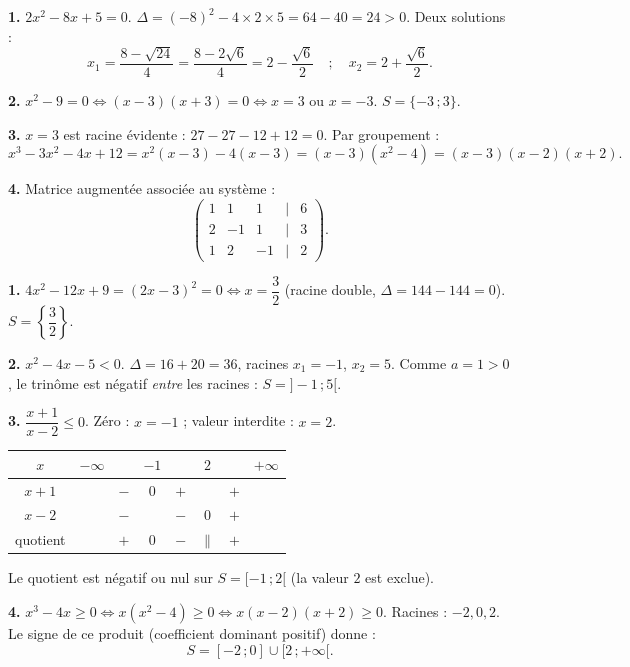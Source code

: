 \documentclass[11pt]{article}
\begin{document}
\begin{corrige}
\textbf{1.} $2x^2 - 8x + 5 = 0$. $\Delta = (-8)^2 - 4 \times 2 \times 5 = 64 - 40 = 24 > 0$. Deux solutions :
\[ x_1 = \frac{8 - \sqrt{24}}{4} = \frac{8 - 2\sqrt{6}}{4} = 2 - \frac{\sqrt{6}}{2} \quad ; \quad x_2 = 2 + \frac{\sqrt{6}}{2}. \]

\textbf{2.} $x^2 - 9 = 0 \iff (x-3)(x+3) = 0 \iff x = 3$ ou $x = -3$. $S = \{-3\,; 3\}$.

\textbf{3.} $x = 3$ est racine évidente : $27 - 27 - 12 + 12 = 0$. Par groupement :
\[ x^3 - 3x^2 - 4x + 12 = x^2(x-3) - 4(x-3) = (x-3)(x^2 - 4) = (x-3)(x-2)(x+2). \]

\textbf{4.} Matrice augmentée associée au système :
\[ \begin{pmatrix} 1 & 1 & 1 & \big| & 6 \\ 2 & -1 & 1 & \big| & 3 \\ 1 & 2 & -1 & \big| & 2 \end{pmatrix}. \]
\end{corrige}

\begin{corrige}
\textbf{1.} $4x^2 - 12x + 9 = (2x-3)^2 = 0 \iff x = \dfrac{3}{2}$ (racine double, $\Delta = 144 - 144 = 0$). $S = \left\{\dfrac{3}{2}\right\}$.

\textbf{2.} $x^2 - 4x - 5 < 0$. $\Delta = 16 + 20 = 36$, racines $x_1 = -1$, $x_2 = 5$. Comme $a = 1 > 0$, le trinôme est négatif \emph{entre} les racines : $S = ]-1\,; 5[$.

\textbf{3.} $\dfrac{x+1}{x-2} \le 0$. Zéro : $x = -1$ ; valeur interdite : $x = 2$.
\begin{center}\begin{tabular}{|c|ccccccc|}\hline $x$ & $-\infty$ & & $-1$ & & $2$ & & $+\infty$ \\ \hline $x+1$ & & $-$ & $0$ & $+$ & & $+$ & \\ \hline $x-2$ & & $-$ & & $-$ & $0$ & $+$ & \\ \hline quotient & & $+$ & $0$ & $-$ & $\|$ & $+$ & \\ \hline\end{tabular}\end{center}
Le quotient est négatif ou nul sur $S = [-1\,; 2[$ (la valeur $2$ est exclue).

\textbf{4.} $x^3 - 4x \ge 0 \iff x(x^2-4) \ge 0 \iff x(x-2)(x+2) \ge 0$. Racines : $-2, 0, 2$. Le signe de ce produit (coefficient dominant positif) donne :
\[ S = [-2\,; 0] \cup [2\,; +\infty[. \]
\end{corrige}
\end{document}
